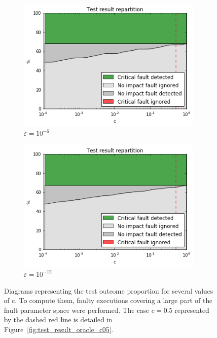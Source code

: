\begin{figure}[h]
\begin{minipage}[b]{0.48\linewidth}
	\begin{subfigure}[t]{\linewidth}
		\centering
		\includegraphics[width=1.1\linewidth]{figures/pores_2/test_result_oracle_0.png}
		\caption{$\varepsilon = 10^{-6}$}\label{fig:pores_2_test_result_oracle_0}	
	\end{subfigure}
    \quad
    \begin{subfigure}[t]{\linewidth}
		\centering
		\includegraphics[width=1.1\linewidth]{figures/pores_2/test_result_oracle_1.png}
		\caption{$\varepsilon = 10^{-12}$}\label{fig:pores_2_test_result_oracle_1}	
	\end{subfigure}

	\end{minipage}
\caption{Diagrams representing the test outcome proportion for several values of c. To compute them, faulty executions covering a large part of the fault parameter space were performed. The case $c = 0.5$ represented by the dashed red line is detailed in Figure~\ref{fig:test_result_oracle_c05}.}\label{fig:test_result_oracle}
\end{figure}





